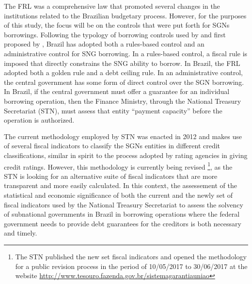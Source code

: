 \documentclass[12pt]{article}
\begin{document}
The FRL was a comprehensive law that promoted several changes in the institutions related to the Brazilian budgetary process. However, for the purposes of this study, the focus will be on the controls that were put forth for SGNs borrowings. Following the typology of borrowing controls used by \citet{ahmad2005} and first proposed by \citet{ter1997}, Brazil has adopted both a rules-based control and an administrative control for SNG borrowing. In a rules-based control, a fiscal rule is imposed that directly constrains the SNG ability to borrow. In Brazil, the FRL adopted both a golden rule and a debt ceiling rule. In an administrative control, the central government has some form of direct control over the SGN borrowing. In Brazil, if the central government must offer a guarantee for an individual borrowing operation, then the Finance Ministry, through the National Treasury Secretariat (STN), must assess that entity ``payment capacity'' before the operation is authorized.

The current methodology employed by STN was enacted in 2012 and makes use of several fiscal indicators to classify the SGNs entities in different credit classifications, similar in spirit to the process adopted by rating agencies in giving credit ratings. However, this methodology is currently being revised \footnote{The STN published the new set fiscal indicators and opened the methodology for a public revision process in the period of 10/05/2017 to 30/06/2017 at the website \url{http://www.tesouro.fazenda.gov.br/sistemagarantiauniao}}, as the STN is looking for an alternative suite of fiscal indicators that are more transparent and more easily calculated. In this context, the assessement of the statistical and economic significance of both the current and the newly set of fiscal indicators used by the National Treasury Secretariat to assess the solvency of subnational governments in Brazil in borrowing operations where the federal government needs to provide debt guarantees for the creditors is both necessary and timely.
\end{document}
